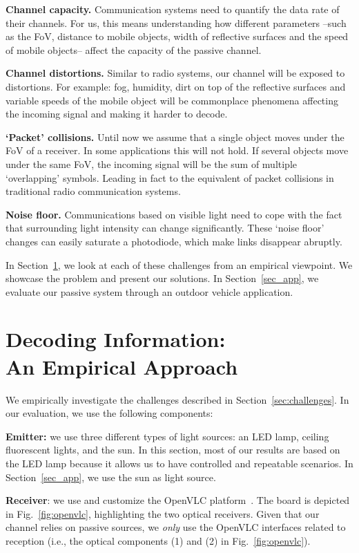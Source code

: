 \documentclass[10pt]{sig-alternate-05-2015}
\begin{document}
{\textbf{Channel capacity.} Communication systems need to quantify the data rate of their channels. For us, this means understanding how different parameters --such as the FoV, distance to mobile objects, width of reflective surfaces and the speed of mobile objects-- affect the capacity of the passive channel.

\textbf{Channel distortions.} Similar to radio systems, our channel will be exposed to distortions. For example: fog, humidity, dirt on top of the reflective surfaces and variable speeds of the mobile object will be commonplace phenomena affecting the incoming signal and making it harder to decode. 

{\textbf{`Packet' collisions.} Until now we assume that a single object moves under the FoV of a receiver. In some applications this will not hold. If several objects move under the same FoV, the incoming signal will be the sum of multiple `overlapping' symbols. Leading in fact to the equivalent of packet collisions in traditional radio communication systems.}

\textbf{Noise floor.} Communications based on visible light need to cope with the fact that surrounding light intensity can change significantly. These `noise floor' changes can easily saturate a photodiode, which make links disappear abruptly.

In Section~\ref{sec_evalu}, we look at each of these challenges from an empirical viewpoint. We showcase the problem and present our solutions. In Section~\ref{sec_app}, we evaluate our passive system through an outdoor vehicle application. 


\section{Decoding Information: \\ An Empirical Approach} \label{sec_evalu}
We empirically investigate the challenges described in Section~\ref{sec:challenges}. In our evaluation, we use the following components:

{\bf{Emitter}:} we use three different types of light sources: an LED lamp, ceiling fluorescent lights, and the sun. In this section, most of our results are based on the LED lamp because it allows us to have controlled and repeatable scenarios.  In Section~\ref{sec_app}, we use the sun as light source. 

{\bf{Receiver}}: we use and customize the OpenVLC platform~\cite{Wang2015wcm}. The board is depicted in Fig.~\ref{fig:openvlc}, highlighting the two optical receivers. Given that our channel relies on passive sources, we \emph{only} use the OpenVLC interfaces related to reception (i.e., the optical components (1) and (2) in Fig.~\ref{fig:openvlc}). 

}
\end{document}
